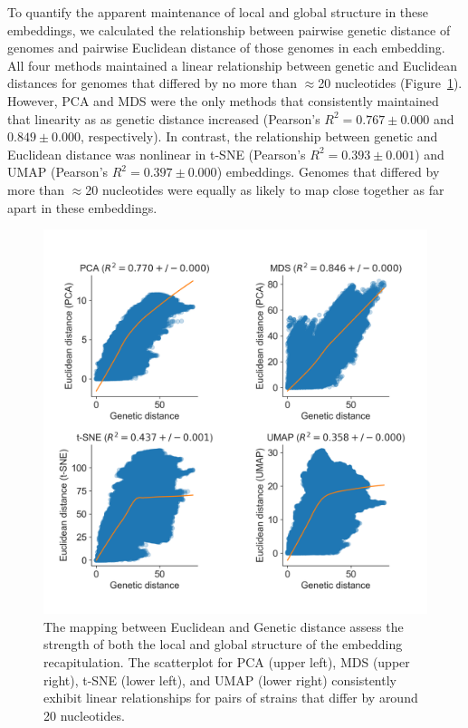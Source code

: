 \documentclass[9pt,lineno]{elife}
\begin{document}
To quantify the apparent maintenance of local and global structure in these embeddings, we calculated the relationship between pairwise genetic distance of genomes and pairwise Euclidean distance of those genomes in each embedding.
All four methods maintained a linear relationship between genetic and Euclidean distances for genomes that differed by no more than $\approx$20 nucleotides (Figure~\ref{fig:seasonal-influenza-h3n2-ha-pairwise-distances}).
However, PCA and MDS were the only methods that consistently maintained that linearity as as genetic distance increased (Pearson's $R^{2} = 0.767 \pm 0.000$  and $0.849 \pm 0.000$, respectively).
In contrast, the relationship between genetic and Euclidean distance was nonlinear in t-SNE (Pearson's $R^{2} = 0.393 \pm 0.001$) and UMAP (Pearson's $R^{2} = 0.397 \pm 0.000$) embeddings.
Genomes that differed by more than $\approx$20 nucleotides were equally as likely to map close together as far apart in these embeddings.

\begin{figure}[htb]
  \begin{center}
  \includegraphics[width=\columnwidth]{FullScatterplotFlu.png}
  \caption{
    The mapping between Euclidean and Genetic distance assess the strength of both the local and global structure of the embedding recapitulation.
    The scatterplot for PCA (upper left), MDS (upper right), t-SNE (lower left), and UMAP (lower right) consistently exhibit linear relationships for pairs of strains that differ by around 20 nucleotides.
  }
  \label{fig:seasonal-influenza-h3n2-ha-pairwise-distances}
  \end{center}
\end{figure}
\end{document}
